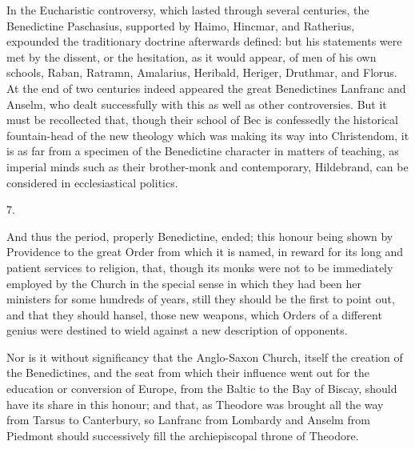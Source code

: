 In the Eucharistic controversy, which lasted through several
centuries, the Benedictine Paschasius, supported by Haimo, Hincmar,
and Ratherius, expounded the traditionary doctrine afterwards defined:
but his statements were met by the dissent, or the hesitation, as it
would appear, of men of his own schools, Raban, Ratramn, Amalarius,
Heribald, Heriger, Druthmar, and Florus. At the end of two centuries
indeed appeared the great Benedictines Lanfranc and Anselm, who dealt
successfully with this as well as other controversies. But it must be
recollected that, though their school of Bec is confessedly the
historical fountain-head of the new theology which was making its way
into Christendom, it is as far from a specimen of the Benedictine
character in matters of teaching, as imperial minds such as their
brother-monk and contemporary, Hildebrand, can be considered in
ecclesiastical politics.

7.

And thus the period, properly Benedictine, ended; this honour being
shown by Providence to the great Order from which it is named, in
reward for its long and patient services to religion, that,
though its monks were not to be immediately employed by the Church in
the special sense in which they had been her ministers for some
hundreds of years, still they should be the first to point out, and
that they should hansel, those new weapons, which Orders of a
different genius were destined to wield against a new description of
opponents.

Nor is it without significancy that the Anglo-Saxon Church, itself
the creation of the Benedictines, and the seat from which their
influence went out for the education or conversion of Europe, from the
Baltic to the Bay of Biscay, should have its share in this honour; and
that, as Theodore was brought all the way from Tarsus to Canterbury,
so Lanfranc from Lombardy and Anselm from Piedmont should successively
fill the archiepiscopal throne of Theodore.
